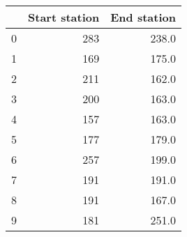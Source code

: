 \begin{tabular}{lrr}
\toprule
{} &  Start station &  End station \\
\midrule
0 &            283 &        238.0 \\
1 &            169 &        175.0 \\
2 &            211 &        162.0 \\
3 &            200 &        163.0 \\
4 &            157 &        163.0 \\
5 &            177 &        179.0 \\
6 &            257 &        199.0 \\
7 &            191 &        191.0 \\
8 &            191 &        167.0 \\
9 &            181 &        251.0 \\
\bottomrule
\end{tabular}
